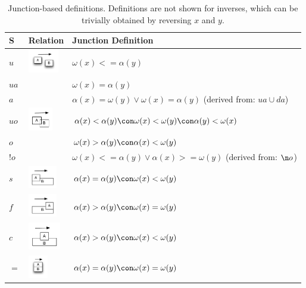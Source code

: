 \documentclass{article}
\def\upstreamOf{\pr{upstream\_of}}
\def\adjacentTo{\pr{adjacent\_to}}
\def\upstreamAdjacentTo{\pr{upstream\_adjacent\_to}}
\def\upstreamOverlaps{\pr{upstream\_overlaps}}
\def\overlaps{\pr{overlaps}}
\def\containedBy{\pr{nt\_contained\_by}}
\def\disconnectedFrom{\pr{disconnected\_from}}
\def\coextensiveWith{\pr{coextensive\_with}}
\def\starts{\pr{starts}}
\def\finishes{\pr{finishes}}
\begin{document}
\begin{table}
\begin{tabular}{ | p{5mm} | p{5cm} | p{8cm} | }
\hline
S & Relation  & Junction Definition \\
\hline
$u$ & \upstreamOf {} \includegraphics[height=1cm]{u}  & $\omega(x) <= \alpha(y)$ \\
\hline
$ua$ & \upstreamAdjacentTo  & $\omega(x)=\alpha(y)$ \\
\hline
$a$ & \adjacentTo  & $\alpha(x) = \omega(y)  \vee  \omega(x)=\alpha(y)$ {} (derived from: $ua \cup da$) \\
\hline
$uo$ & \small{\upstreamOverlaps} {} \includegraphics[height=1cm]{uo}  & $\alpha(x) < \alpha(y) \con \omega(x) < \omega(y) \con \alpha(y) < \omega(x)$ \\
\hline
$o$ & \small{\overlaps}  & $\omega(x) > \alpha(y) \con \alpha(x) < \omega(y)$  \\
\hline
$!o$ & \small{\disconnectedFrom}  & $\omega(x) <= \alpha(y) \vee \alpha(x) >= \omega(y)$ {} (derived from: $\n o$)\\
\hline
$s$ & \starts {} \includegraphics[height=1cm]{s}  & $\alpha(x) = \alpha(y) \con \omega(x) < \omega(y)$ \\
\hline
$f$ & \finishes {} \includegraphics[height=1cm]{f}  & $\alpha(x) > \alpha(y) \con \omega(x) = \omega(y)$ \\
\hline
$c$ & \containedBy {} \includegraphics[height=1.2cm]{p} & $\alpha(x) >  \alpha(y) \con \omega(x) < \omega(y)$ \\
\hline
$=$ & \coextensiveWith {} \includegraphics[height=1cm]{eq}  &  $\alpha(x)=\alpha(y) \con \omega(x)=\omega(y)$ \\
\hline
\end{tabular}
\caption{Junction-based definitions. Definitions are not shown for inverses, which can be trivially obtained by reversing $x$ and $y$.}
\label{tab:junction-defs}
\end{table}
\end{document}
